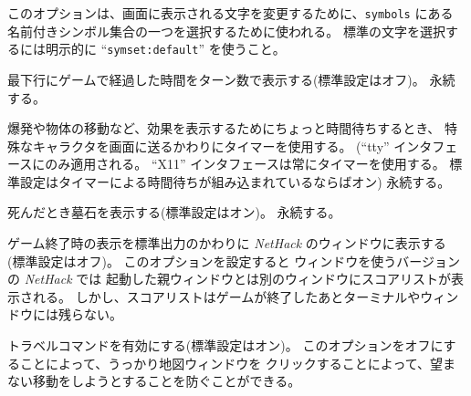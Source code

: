 このオプションは、画面に表示される文字を変更するために、{\tt symbols} にある
名前付きシンボル集合の一つを選択するために使われる。
標準の文字を選択するには明示的に ``{\tt symset:default}'' を使うこと。
\item[\ib{time}]
最下行にゲームで経過した時間をターン数で表示する(標準設定はオフ)。
永続する。
\item[\ib{timed\verb+_+delay}]
爆発や物体の移動など、効果を表示するためにちょっと時間待ちするとき、
特殊なキャラクタを画面に送るかわりにタイマーを使用する。
(``tty'' インタフェースにのみ適用される。
``X11'' インタフェースは常にタイマーを使用する。
標準設定はタイマーによる時間待ちが組み込まれているならばオン)
永続する。
\item[\ib{tombstone}]
死んだとき墓石を表示する(標準設定はオン)。
永続する。
\item[\ib{toptenwin}]
ゲーム終了時の表示を標準出力のかわりに {\it NetHack\/} のウィンドウに表示する
(標準設定はオフ)。
このオプションを設定すると
ウィンドウを使うバージョンの {\it NetHack\/} では
起動した親ウィンドウとは別のウィンドウにスコアリストが表示される。
しかし、スコアリストはゲームが終了したあとターミナルやウィンドウには残らない。
\item[\ib{travel}]
トラベルコマンドを有効にする(標準設定はオン)。
このオプションをオフにすることによって、うっかり地図ウィンドウを
クリックすることによって、望まない移動をしようとすることを防ぐことができる。
